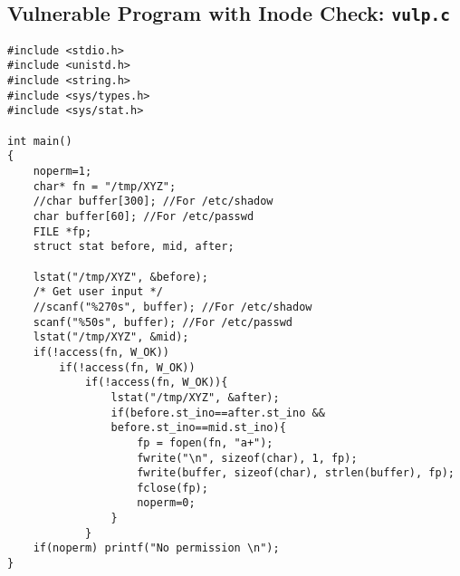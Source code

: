 \documentclass[a4paper,12pt]{article}
\begin{document}
  \subsection{Vulnerable Program with Inode Check: \texttt{vulp.c}}
  \label{Appsec:3.3}
 \begin{verbatim}
#include <stdio.h>
#include <unistd.h>
#include <string.h>
#include <sys/types.h>
#include <sys/stat.h>
 
int main()
{
    noperm=1;
    char* fn = "/tmp/XYZ";
    //char buffer[300]; //For /etc/shadow
    char buffer[60]; //For /etc/passwd
    FILE *fp;
    struct stat before, mid, after;
 
    lstat("/tmp/XYZ", &before);
    /* Get user input */
    //scanf("%270s", buffer); //For /etc/shadow
    scanf("%50s", buffer); //For /etc/passwd
    lstat("/tmp/XYZ", &mid);
    if(!access(fn, W_OK))
        if(!access(fn, W_OK))
            if(!access(fn, W_OK)){
                lstat("/tmp/XYZ", &after);
                if(before.st_ino==after.st_ino && 
                before.st_ino==mid.st_ino){
                    fp = fopen(fn, "a+");
                    fwrite("\n", sizeof(char), 1, fp);
                    fwrite(buffer, sizeof(char), strlen(buffer), fp);
                    fclose(fp);
                    noperm=0;
                }
            }
    if(noperm) printf("No permission \n");
}
 \end{verbatim}
\end{document}
